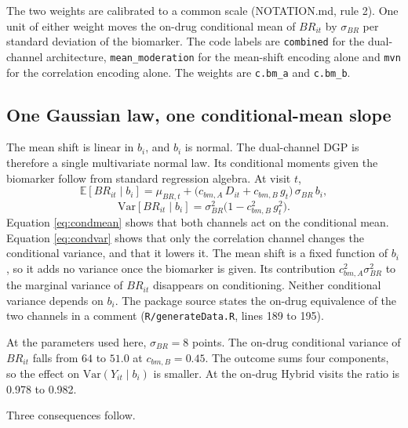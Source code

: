 \documentclass[
  11pt,
]{article}
\begin{document}
The two weights are calibrated to a common scale (NOTATION.md,
rule 2). One unit of either weight moves the on-drug conditional mean
of \(BR_{it}\) by \(\sigma_{BR}\) per standard deviation of the
biomarker. The code labels are \texttt{combined} for the dual-channel
architecture, \texttt{mean\_moderation} for the mean-shift encoding alone and
\texttt{mvn} for the correlation encoding alone. The weights are \texttt{c.bm\_a}
and \texttt{c.bm\_b}.

\subsection{One Gaussian law, one conditional-mean slope}\label{sec-gauss}

The mean shift is linear in \(b_i\), and \(b_i\) is normal. The
dual-channel DGP is therefore a single multivariate normal law. Its
conditional moments given the biomarker follow from standard
regression algebra. At visit \(t\),
\begin{equation}
\mathbb{E}[BR_{it} \mid b_i] = \mu_{BR,t}
  + \bigl(c_{bm,A}\, D_{it} + c_{bm,B}\, g_t\bigr)\,\sigma_{BR}\, b_i,
\label{eq:condmean}
\end{equation}
\begin{equation}
\mathrm{Var}[BR_{it} \mid b_i] = \sigma_{BR}^2
  \bigl(1 - c_{bm,B}^2\, g_t^2\bigr).
\label{eq:condvar}
\end{equation}
Equation \eqref{eq:condmean} shows that both channels act on the
conditional mean. Equation \eqref{eq:condvar} shows that only the
correlation channel changes the conditional variance, and that it
lowers it. The mean shift is a fixed function of \(b_i\), so it adds no
variance once the biomarker is given. Its contribution
\(c_{bm,A}^2\sigma_{BR}^2\) to the marginal variance of \(BR_{it}\)
disappears on conditioning. Neither conditional variance depends on
\(b_i\). The package source states the on-drug equivalence of the two
channels in a comment (\texttt{R/generateData.R}, lines 189 to 195).

At the parameters used here, \(\sigma_{BR} = 8\) points. The
on-drug conditional variance of \(BR_{it}\) falls from
\(64\) to \(51.0\) at
\(c_{bm,B} = 0.45\). The outcome sums four components, so the effect
on \(\mathrm{Var}(Y_{it} \mid b_i)\) is smaller. At the on-drug Hybrid
visits the ratio is 0.978
to 0.982.

Three consequences follow.
\end{document}
